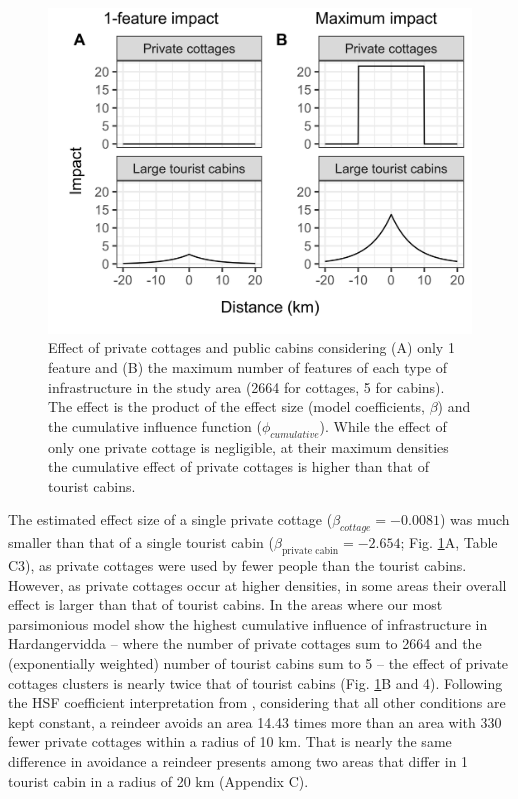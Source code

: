 \documentclass[titlepage]{article}
\begin{document}
{\begin{figure}[h]
\centering
\includegraphics[width=1\textwidth,center]{figures/reindeer_zoi_impact_single_multiple_features.png}
\caption{\label{fig:impact_plot} Effect of private cottages and public cabins considering (A) only 1 feature and (B) the maximum number of features of each type of infrastructure in the study area (2664 for cottages, 5 for cabins). The effect is the product of the effect size (model coefficients, $\beta$) and the cumulative influence function ($\phi_{cumulative}$). While the effect of only one private cottage is negligible, at their maximum densities the cumulative effect of private cottages is higher than that of tourist cabins.}
\end{figure}

The estimated effect size of a single private
cottage ($\beta_{cottage} = -0.0081$) was much smaller than that of a single tourist cabin
($\beta_{\text{private cabin}} = -2.654$; Fig. \ref{fig:impact_plot}A, Table C3), as
private cottages were used by fewer people than the tourist cabins. However, as
private cottages occur at higher densities, in some areas their overall effect 
is larger than that of tourist cabins. In the areas where our most parsimonious model show the 
highest cumulative influence of infrastructure in Hardangervidda -- where the number of private cottages sum to 2664 
and the (exponentially weighted) number of tourist cabins sum to 5 -- the effect of 
private cottages clusters is nearly twice that of tourist cabins
 (Fig. \ref{fig:impact_plot}B and 4). Following the HSF coefficient interpretation from \citet{fieberg_how_2021}, considering that all other conditions are kept constant, a reindeer avoids an area 14.43 times more than an area with
330 fewer private cottages within a radius of 10 km. That is nearly the same difference in avoidance a reindeer presents among two areas 
that differ in 1 tourist cabin in a radius of 20 km (Appendix C).

}
\end{document}
